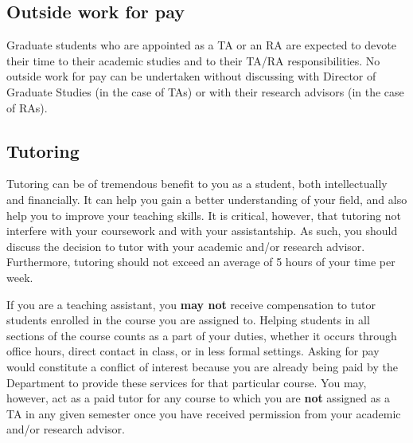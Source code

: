 \subsection{Outside work for pay}

Graduate students who are appointed as a TA
or an RA are expected to devote their time to their academic studies
and to their TA/RA responsibilities. No outside work for pay can be
undertaken without discussing with Director of Graduate Studies (in
the case of TAs) or with their research advisors (in the case of RAs).

\subsection{Tutoring}

Tutoring can be of tremendous benefit to you as a student, both
intellectually and financially.  It can help you gain a better
understanding of your field, and also help you to improve your
teaching skills.  It is critical, however, that tutoring not interfere
with your coursework and with your assistantship.  As such, you should
discuss the decision to tutor with your academic and/or research
advisor.  Furthermore, tutoring should not exceed an average of 5
hours of your time per week.

If you are a teaching assistant, you \textbf{may not} receive
compensation to tutor students enrolled in the course you are assigned
to.  Helping students in all sections of the course counts as a part
of your duties, whether it occurs through office hours, direct contact
in class, or in less formal settings.  Asking for pay would constitute
a conflict of interest because you are already being paid by the
Department to provide these services for that particular course.  You
may, however, act as a paid tutor for any course to which you are
\textbf{not} assigned as a TA in any given semester once you have
received permission from your academic and/or research advisor.
